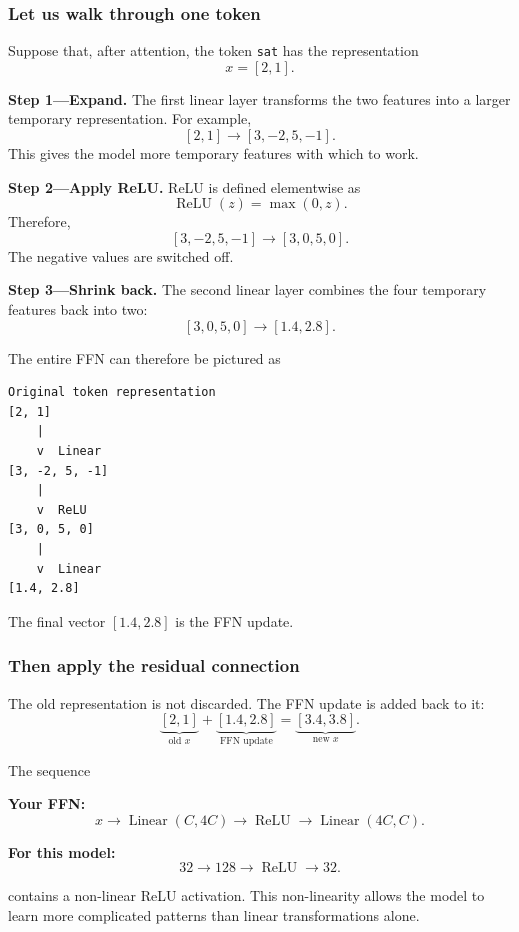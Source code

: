 \subsubsection*{Let us walk through one token}

Suppose that, after attention, the token \texttt{sat} has the representation
\[
  x=[2,1].
\]

\textbf{Step 1---Expand.} The first linear layer transforms the two features
into a larger temporary representation. For example,
\[
  [2,1]\longrightarrow[3,-2,5,-1].
\]
This gives the model more temporary features with which to work.

\textbf{Step 2---Apply ReLU.} ReLU is defined elementwise as
\[
  \operatorname{ReLU}(z)=\max(0,z).
\]
Therefore,
\[
  [3,-2,5,-1]\longrightarrow[3,0,5,0].
\]
The negative values are switched off.

\textbf{Step 3---Shrink back.} The second linear layer combines the four
temporary features back into two:
\[
  [3,0,5,0]\longrightarrow[1.4,2.8].
\]

The entire FFN can therefore be pictured as
\begin{lstlisting}[style=shadedpython,language={}]
Original token representation
[2, 1]
    |
    v  Linear
[3, -2, 5, -1]
    |
    v  ReLU
[3, 0, 5, 0]
    |
    v  Linear
[1.4, 2.8]
\end{lstlisting}

The final vector \([1.4,2.8]\) is the FFN update.

\subsubsection*{Then apply the residual connection}

The old representation is not discarded. The FFN update is added back to it:
\[
  \underbrace{[2,1]}_{\text{old }x}
  +
  \underbrace{[1.4,2.8]}_{\text{FFN update}}
  =
  \underbrace{[3.4,3.8]}_{\text{new }x}.
\]

The sequence

\textbf{Your FFN:}
\[
  x
  \longrightarrow \operatorname{Linear}(C,4C)
  \longrightarrow \operatorname{ReLU}
  \longrightarrow \operatorname{Linear}(4C,C).
\]

\textbf{For this model:}
\[
  32\longrightarrow128
  \longrightarrow\operatorname{ReLU}
  \longrightarrow32.
\]

contains a non-linear ReLU activation. This non-linearity allows the model to learn more complicated patterns than linear transformations alone.

